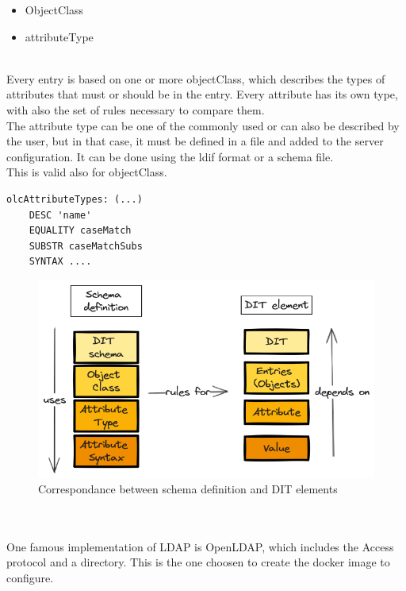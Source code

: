 \begin{itemize}
    \item ObjectClass 
    \item attributeType 
\end{itemize}
\\
Every entry is based on one or more objectClass, which describes the types of attributes that must or should be in the entry.  Every attribute has its own type, with also the set of rules necessary to compare them. 
\\
The attribute type can be one of the commonly used or can also be described by the user, but in that case, it must be defined in a file and added to the server configuration. It can be done using the ldif format or a schema file.
\\
This is valid also for objectClass.
\begin{mdframed}[backgroundcolor=back1]
    \begin{lstlisting}[style=bash, caption={Example of definition of an attributeType (for objectClasses is similar)}]
olcAttributeTypes: (...)
    DESC 'name'
    EQUALITY caseMatch
    SUBSTR caseMatchSubs
    SYNTAX ....
    \end{lstlisting}
\end{mdframed}
\begin{figure}[h]
    \caption{Correspondance between schema definition and DIT elements}
    \centering
    \includegraphics[width=\textwidth]{img/dit.png}
\end{figure}
\\\\
One famous implementation of LDAP is OpenLDAP, which includes the Access protocol and a directory. This is the one choosen to create the docker image to configure.
